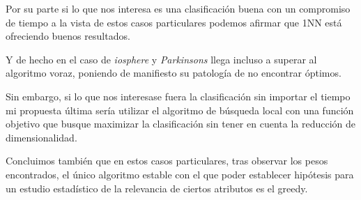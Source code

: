 Por su parte si lo que nos interesa es una clasificación buena con un compromiso de tiempo a la vista de estos casos particulares podemos afirmar que 1NN está ofreciendo buenos resultados. 

Y de hecho en el caso de \textit{iosphere} y \textit{Parkinsons} llega incluso a superar al algoritmo voraz, poniendo de manifiesto su patología de no encontrar óptimos. 

Sin embargo, si lo que nos interesase fuera la clasificación sin importar el tiempo
mi propuesta última sería utilizar el algoritmo de búsqueda local con una función objetivo que busque maximizar la clasificación sin tener en cuenta la reducción de dimensionalidad.

Concluimos también que en estos casos particulares, tras observar los pesos encontrados, el único algoritmo estable con el que poder establecer hipótesis para un estudio estadístico de la relevancia de ciertos atributos es el greedy.


